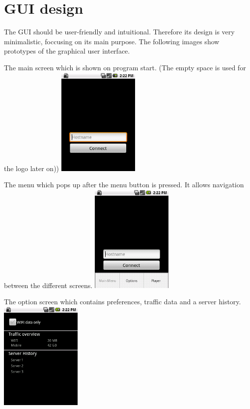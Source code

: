 \documentclass[a4paper,10pt]{scrartcl}
\begin{document}
\section{GUI design}
The GUI should be user-friendly and intuitional. Therefore its design is very minimalistic, foccusing on its main purpose. 
The following images show prototypes of the graphical user interface.

\begin{illustration}{The main screen which is shown on program start. (The empty space is used for the logo later on))}
\includegraphics[width=150px]{figures/images/mainscreen.png}
\end{illustration}
\begin{illustration}{The menu which pops up after the menu button is pressed. It allows navigation between the different screens.}
\includegraphics[width=150px]{figures/images/menu.png}
\end{illustration}
\begin{illustration}{The option screen which contains preferences, traffic data and a server history.}
\includegraphics[width=150px]{figures/images/optionscreen.png}
\end{illustration}
\end{document}
